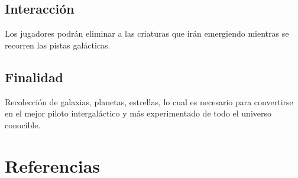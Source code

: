 \documentclass{article}
\begin{document}
\subsection{Interacción}
Los jugadores podrán eliminar a las criaturas que irán emergiendo mientras se recorren las pistas galácticas.

\subsection{Finalidad}
Recolección de galaxias, planetas, estrellas, lo cual es necesario para convertirse en el mejor piloto intergaláctico y más experimentado de todo el universo conocible. 
\newpage
\section{Referencias}


\cite{calistenia}
\end{document}
